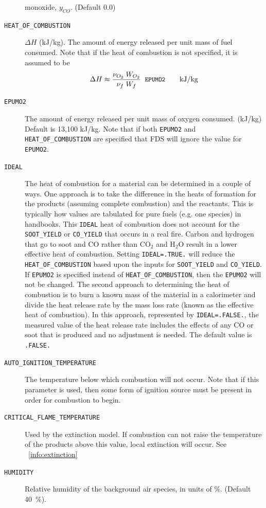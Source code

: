 \documentclass[11pt]{book}
\newcommand{\ct}{\tt\small}
\newcommand{\be}{\begin{equation}}
\newcommand{\ee}{\end{equation}}
\begin{document}
\begin{description}
monoxide, $y_{CO}$. (Default 0.0)
\item[{\ct HEAT\_OF\_COMBUSTION}] $\Delta H$ (kJ/kg). The amount of
energy released per unit mass of fuel consumed. Note that if the heat of combustion is not
specified, it is assumed to be
\be \Delta H \approx \frac{\nu_{O_2} \; W_{O_2} } { \nu_{f} \; W_{f} } \; \; \hbox{\ct EPUMO2}  \quad \quad \hbox{kJ/kg}  \label{EPUMO2} \ee
\item[{\ct EPUMO2}] The amount of energy released per unit mass of oxygen consumed. (kJ/kg)
Default is 13,100 kJ/kg.  Note that if both {\ct EPUMO2} and {\ct HEAT\_OF\_COMBUSTION} are
specified that FDS will ignore the value for {\ct EPUMO2}.
\item[{\ct IDEAL}]  The heat of combustion for a material can be determined in a couple of ways.  One approach is to take the difference in the heats of formation for the products (assuming complete combustion) and the reactants.  This is typically how values are tabulated for pure fuels (e.g. one species) in handbooks.  This {\ct IDEAL} heat of combustion does not account for the  {\ct SOOT\_YIELD} or  {\ct CO\_YIELD} that occurs in a real fire.  Carbon and hydrogen that go to soot and CO rather than CO$_2$ and H$_2$O result in a lower effective heat of combustion.  Setting {\ct IDEAL=.TRUE.} will reduce the {\ct HEAT\_OF\_COMBUSTION} based upon the inputs for {\ct SOOT\_YIELD} and {\ct CO\_YIELD}. If {\ct EPUMO2} is specified instead of {\ct HEAT\_OF\_COMBUSTION}, then the {\ct EPUMO2} will not be changed.  The second approach to determining the heat of combustion is to burn a known mass of the material in a calorimeter and divide the heat release rate by the mass loss rate (known as the effective heat of combustion).  In this approach, represented by {\ct IDEAL=.FALSE.}, the measured value of the heat release rate includes the effects of any CO or soot that is produced and no adjustment is needed.  The default value is {\ct .FALSE.}
\item[{\ct AUTO\_IGNITION\_TEMPERATURE}] The temperature below which combustion will not occur.
Note that if this parameter is used, then some form of ignition source must be present in order for combustion to begin.
\item[{\ct CRITICAL\_FLAME\_TEMPERATURE}] Used by the extinction model.  If combustion can not raise the temperature of the products above this value, local extinction will occur.  See ~\ref{info:extinction}
\item[{\ct HUMIDITY}] Relative humidity of the background air species, in units of \%. (Default 40~\%).
\end{description}
\end{document}
